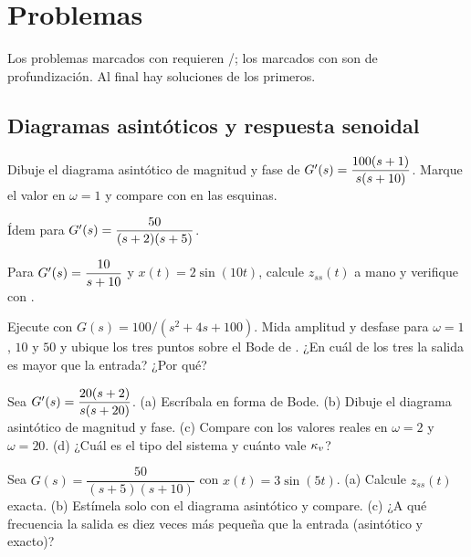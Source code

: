 \section{Problemas}
\label{sec:rf-problemas}

Los problemas marcados con \etiquetaM{} requieren \matlab/\simulink; los marcados con \etiquetaEstrella{} son de profundización. Al final hay soluciones de los primeros.

\subsection*{Diagramas asintóticos y respuesta senoidal}

\begin{problema}[asintótico]\label{prob:rf-1}
Dibuje el diagrama asintótico de magnitud y fase de $G'(s)=\dfrac{100(s+1)}{s(s+10)}$. Marque el valor en $\omega=1$ y compare con  en las esquinas.
\end{problema}

\begin{problema}[asintótico]\label{prob:rf-2}
Ídem para $G'(s)=\dfrac{50}{(s+2)(s+5)}$.
\end{problema}

\begin{problema}\label{prob:rf-3}
Para $G'(s)=\dfrac{10}{s+10}$ y $x(t)=2\sin(10t)$, calcule $z_{ss}(t)$ a mano y verifique con .
\end{problema}

\begin{problema}[Simulink]\label{prob:rf-4}
\etiquetaM{} Ejecute  con $G(s)=100/(s^2+4s+100)$. Mida amplitud y desfase para $\omega=1$, $10$ y $50$ y ubique los tres puntos sobre el Bode de \matlab. ¿En cuál de los tres la salida es mayor que la entrada? ¿Por qué?
\end{problema}

\begin{problema}[repaso]\label{prob:rf-5}
Sea $G'(s)=\dfrac{20(s+2)}{s(s+20)}$. (a) Escríbala en forma de Bode. (b) Dibuje el diagrama asintótico de magnitud y fase. (c) Compare con los valores reales en $\omega=2$ y $\omega=20$. (d) ¿Cuál es el tipo del sistema y cuánto vale $\kappa_v$?
\end{problema}

\begin{problema}[repaso]\label{prob:rf-6}
Sea $G(s)=\dfrac{50}{(s+5)(s+10)}$ con $x(t)=3\sin(5t)$. (a) Calcule $z_{ss}(t)$ exacta. (b) Estímela solo con el diagrama asintótico y compare. (c) ¿A qué frecuencia la salida es diez veces más pequeña que la entrada (asintótico y exacto)?
\end{problema}

